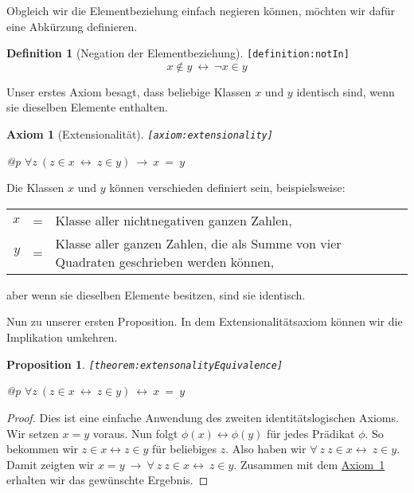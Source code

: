 \documentclass[a4paper,german,10pt,twoside]{book}
\newtheorem{prop}[thm]{Proposition}
\newtheorem{ax}{Axiom}
\theoremstyle{definition}
\newtheorem{defn}{Definition}
\theoremstyle{remark}
\begin{document}
\par
Obgleich wir die Elementbeziehung einfach negieren k{\"o}nnen, m{\"o}chten wir daf{\"u}r eine Abk{\"u}rzung definieren.

\begin{defn}[Negation der Elementbeziehung]
\label{definition:notIn} \hypertarget{definition:notIn}{}
{\tt \tiny [\verb]definition:notIn]]}
$$x \notin y\ \leftrightarrow\ \neg x \in y$$

\end{defn}


\par
Unser erstes Axiom besagt, dass beliebige Klassen $x$ und $y$ identisch sind, wenn sie dieselben Elemente enthalten.

\begin{ax}[Extensionalit{\"a}t]
\label{axiom:extensionality} \hypertarget{axiom:extensionality}{}
{\tt \tiny [\verb]axiom:extensionality]]}
\mbox{}
\begin{longtable}{{@{\extracolsep{\fill}}p{\linewidth}}}
\centering $\forall z\ (z \in x\ \leftrightarrow\ z \in y)\ \rightarrow\ x \ = \ y$
\end{longtable}

\end{ax}

Die Klassen $x$ und $y$ k{\"o}nnen verschieden definiert sein, beispielsweise:
\par
\begin{tabularx}{\linewidth}{rcX}
  $x$ & = & Klasse aller nichtnegativen ganzen Zahlen, \\
  $y$ & = & Klasse aller ganzen Zahlen, die als Summe von vier Quadraten geschrieben werden k{\"o}nnen,
\end{tabularx}
\par
aber wenn sie dieselben Elemente besitzen, sind sie identisch.


\par
Nun zu unserer ersten Proposition.
In dem Extensionalit{\"a}tsaxiom k{\"o}nnen wir die Implikation umkehren.

\begin{prop}
\label{theorem:extensonalityEquivalence} \hypertarget{theorem:extensonalityEquivalence}{}
{\tt \tiny [\verb]theorem:extensonalityEquivalence]]}
\mbox{}
\begin{longtable}{{@{\extracolsep{\fill}}p{\linewidth}}}
\centering $\forall z\ (z \in x\ \leftrightarrow\ z \in y)\ \leftrightarrow\ x \ = \ y$
\end{longtable}

\end{prop}
\begin{proof}
Dies ist eine einfache Anwendung des zweiten identit{\"a}tslogischen Axioms. Wir setzen $x=y$ voraus. Nun folgt $\phi(x) \leftrightarrow \phi(y)$ f{\"u}r jedes Pr{\"a}dikat $\phi$. So bekommen wir $z \in x \leftrightarrow z \in y$ f{\"u}r beliebiges $z$. Also haben wir $\forall \ z \ z  \in x \leftrightarrow \ z \in y$. Damit zeigten wir $x = y \ \rightarrow \ \forall \ z \ z  \in x \leftrightarrow \ z \in y$. Zusammen mit dem \hyperlink{axiom:extensionality}{Axiom~1} erhalten wir das gew{\"u}nschte Ergebnis.
\end{proof}
\end{document}
